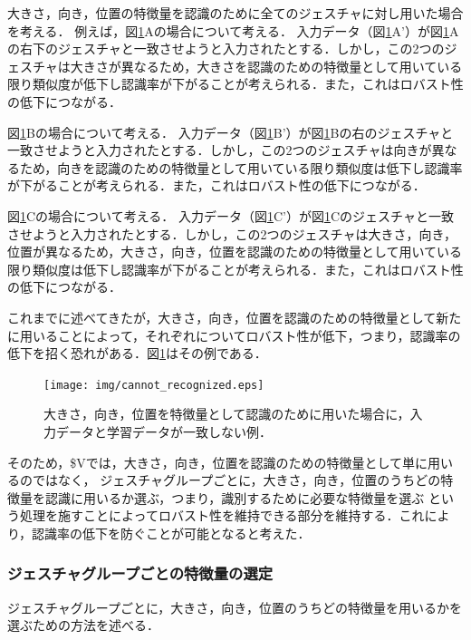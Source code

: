 大きさ，向き，位置の特徴量を認識のために全てのジェスチャに対し用いた場合を考える．
例えば，図\ref{fig:cannot_recognized}Aの場合について考える．
入力データ（図\ref{fig:cannot_recognized}A'）が図\ref{fig:cannot_recognized}Aの右下のジェスチャと一致させようと入力されたとする．しかし，この2つのジェスチャは大きさが異なるため，大きさを認識のための特徴量として用いている限り類似度が低下し認識率が下がることが考えられる．また，これはロバスト性の低下につながる．

図\ref{fig:cannot_recognized}Bの場合について考える．
入力データ（図\ref{fig:cannot_recognized}B'）が図\ref{fig:cannot_recognized}Bの右のジェスチャと一致させようと入力されたとする．しかし，この2つのジェスチャは向きが異なるため，向きを認識のための特徴量として用いている限り類似度は低下し認識率が下がることが考えられる．また，これはロバスト性の低下につながる．

図\ref{fig:cannot_recognized}Cの場合について考える．
入力データ（図\ref{fig:cannot_recognized}C'）が図\ref{fig:cannot_recognized}Cのジェスチャと一致させようと入力されたとする．しかし，この2つのジェスチャは大きさ，向き，位置が異なるため，大きさ，向き，位置を認識のための特徴量として用いている限り類似度は低下し認識率が下がることが考えられる．また，これはロバスト性の低下につながる．

これまでに述べてきたが，大きさ，向き，位置を認識のための特徴量として新たに用いることによって，それぞれについてロバスト性が低下，つまり，認識率の低下を招く恐れがある．図\ref{fig:cannot_recognized}はその例である．

\begin{figure} [h!]
	\begin{center}
		\texttt{[image: img/cannot\_recognized.eps]}
	\end{center}
	\caption{大きさ，向き，位置を特徴量として認識のために用いた場合に，入力データと学習データが一致しない例．}
	\label{fig:cannot_recognized}
\end{figure}

そのため，\$Vでは，大きさ，向き，位置を認識のための特徴量として単に用いるのではなく，
ジェスチャグループごとに，大きさ，向き，位置のうちどの特徴量を認識に用いるか選ぶ，つまり，識別するために必要な特徴量を選ぶ
という処理を施すことによってロバスト性を維持できる部分を維持する．これにより，認識率の低下を防ぐことが可能となると考えた．

\subsubsection{ジェスチャグループごとの特徴量の選定}
ジェスチャグループごとに，大きさ，向き，位置のうちどの特徴量を用いるかを選ぶための方法を述べる．

